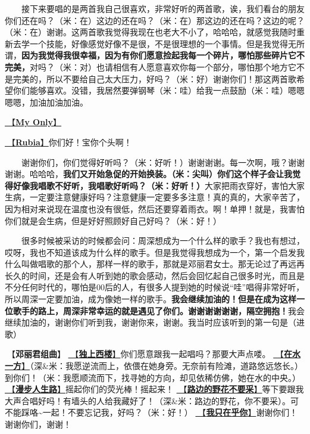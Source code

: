\documentclass[]{ctexbook}
\begin{document}
  接下来要唱的是两首我自己很喜欢，非常好听的两首歌，诶，我们看台的朋友你们还在吗？（米：在）这边的还在吗？（米：在）那这边的还在吗？这边的呢？（米：在）谢谢。这两首歌我觉得我现在也老大不小了，哈哈哈，就感觉我随时重新去学一个技能，好像感觉好像不是很，不是很理想的一个事情。但是我觉得无所谓，\textbf{因为我觉得我很幸福，因为有你们愿意捡起我每一个碎片，哪怕那些碎片它不完美，}对吗？（米：对）也请相信有人愿意喜欢你每一个部分，哪怕那个地方它不是完美的，所以不要给自己太大压力，好吗？（米：好）谢谢你们！那这两首歌希望你们能够喜欢。没错，我居然要弹钢琴（米：哇）给我一点鼓励（米：哇）嗯嗯嗯嗯，加油加油加油。

\hyperref[my-only]{🎵【\textbf{My Only}】}

\hyperref[rubia]{🎵【\textbf{Rubia}】}你们好！宝你个头啊！

  谢谢你们，你们觉得好听吗？（米：好听！）谢谢谢谢。每一次啊，哦？谢谢谢谢。哈哈哈，\textbf{我们又开始急促的开始换装。（米：尖叫）你们这个样子会让我觉得好像我唱歌不好听，我唱歌好听吗？（米：好听！）}大家把雨衣穿好，害怕大家生病，一定要注意健康好吗？注意健康一定要多多注意！真的真的，大家辛苦了，因为相对来说现在温度也没有很低，然后还要穿着雨衣。啊！单押！就是，我害怕你们就是会生病，但是好好照顾好自己好吗？（米：好！）

  很多时候被采访的时候都会问：周深想成为一个什么样的歌手？我也有想过，哎呀，我也不知道该成为什么样的歌手。但是我觉得我想成为一个，第一个启发我什么叫做唱歌的那个人，那样一样的歌手，那就是邓丽君女士。那无论过了再远再长久的时间，还是会有人听到她的歌会感动，然后会回忆起自己很多时光，而且是不分任何时代的，哪怕是00后的人，有很多人提到她的时候说``哇''唱得非常好听，所以周深一定要加油，成为像她一样的歌手。\textbf{我会继续加油的！但是在成为这样一位歌手的路上，周深非常幸运的就是遇见了你们。谢谢谢谢谢谢，隔空拥抱！}我会继续加油的，谢谢你们听到我，谢谢你来，谢谢。我当时应该听到的第一句是（进歌）

🎵【\textbf{邓丽君组曲}】
\hyperref[one-in-the-building]{🎵【\textbf{独上西楼}】}你们愿意跟我一起唱吗？那要大声点喽。
\hyperref[on-the-water-side]{🎵【\textbf{在水一方}】}（深\&米：我愿逆流而上，依偎在她身旁。无奈前有险滩，道路悠远悠长。）到你们！（米：我愿顺流而下，找寻她的方向，却见依稀仿佛，她在水的中央。）
\hyperref[walk-the-road-of-life]{🎵【\textbf{漫步人生路}】}摇起你们的荧光棒！摇起来！
\hyperref[only-with-me]{🎵【\textbf{路边的野花不要采}】}等下要跟我大声合唱好吗！有墙头的人给我藏好了！（深\&米：路边的野花，你不要采）。可不能踩咯\textasciitilde 一起！不要忘记我，好吗？（米：好！）
\hyperref[only-you]{🎵【\textbf{我只在乎你}】}谢谢你们！谢谢你们，谢谢！
\end{document}
